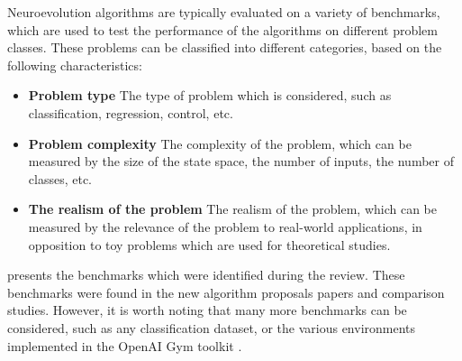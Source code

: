 Neuroevolution algorithms are typically evaluated on a variety of benchmarks, which are used to test the performance of the algorithms on different problem classes.
These problems can be classified into different categories, based on the following characteristics:

\begin{itemize}
    \item \textbf{Problem type} The type of problem which is considered, such as classification, regression, control, etc.
    \item \textbf{Problem complexity} The complexity of the problem, which can be measured by the size of the state space, the number of inputs, the number of classes, etc.
    \item \textbf{The realism of the problem} The realism of the problem, which can be measured by the relevance of the problem to real-world applications, in opposition to
        toy problems which are used for theoretical studies.
\end{itemize}

 presents the benchmarks which were identified during the review. These benchmarks were found in the new algorithm proposals papers
and comparison studies. However, it is worth noting that many more benchmarks can be considered, such as any classification dataset, or the various environments implemented
in the OpenAI Gym toolkit \cite{gym}.

